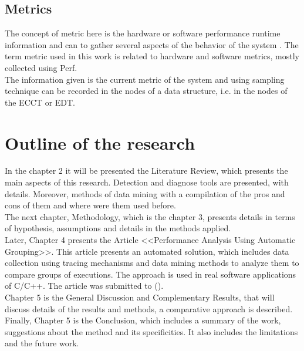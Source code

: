 \subsection{Metrics}
The concept of metric here is the hardware or software performance runtime information and can to gather several aspects of the behavior of the system \cite{giraldeau-ols2011}. The term metric used in this work is related to hardware and software metrics, mostly collected using Perf. \\
The information given is the current metric of the system and using sampling technique can be recorded in the nodes of a data structure, i.e. in the nodes of the ECCT or EDT.
\section{Outline of the research}
In the chapter 2 it will be presented the Literature Review, which presents the main aspects of this research. Detection and diagnose tools are presented, with details. Moreover, methods of data mining with a compilation of the pros and cons of them and where were them used before.\\
The next chapter, Methodology, which is the chapter 3, presents details in terms of hypothesis, assumptions and details in the methods applied. \\
Later, Chapter 4 presents the Article <<Performance Analysis Using Automatic Grouping>>. This article presents an automated solution, which includes data collection using tracing mechanisms and data mining methods to analyze them to compare groups of executions. The approach is used in real software applications of C/C++. The article was submitted to ().\\
Chapter 5 is the General Discussion and Complementary Results, that will discuss details of the results and methods, a comparative approach is described.
Finally, Chapter 5 is the Conclusion, which includes a summary of the work, suggestions about the method and its specificities. It also includes the limitations and the future work.



